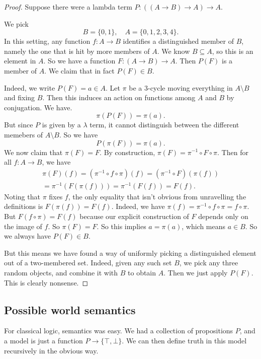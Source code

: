 \documentclass[a4paper]{article}
\begin{document}
\begin{proof}
  Suppose there were a lambda term $P: ((A \to B) \to A) \to A$.

  We pick
  \[
    B = \{0, 1\}, \quad A = \{0, 1, 2, 3, 4\}.
  \]
  In this setting, any function $f: A \to B$ identifies a distinguished member of $B$, namely the one that is hit by more members of $A$. We know $B \subseteq A$, so this is an element in $A$. So we have a function $F: (A \to B) \to A$. Then $P(F)$ is a member of $A$. We claim that in fact $P(F) \in B$.

  Indeed, we write $P(F) = a \in A$. Let $\pi$ be a $3$-cycle moving everything in $A \setminus B$ and fixing $B$. Then this induces an action on functions among $A$ and $B$ by conjugation. We have.
  \[
    \pi(P(F)) = \pi(a).
  \]
  But since $P$ is given by a $\lambda$ term, it cannot distinguish between the different memebers of $A \setminus B$. So we have
  \[
    P(\pi(F)) = \pi(a).
  \]
  We now claim that $\pi(F) = F$. By construction, $\pi (F) = \pi^{-1} \circ F \circ \pi$. Then for all $f: A \to B$, we have
  \begin{multline*}
    \pi(F)(f) = (\pi^{-1} \circ f \circ \pi)(f) = (\pi^{-1} \circ F)(\pi(f)) \\
    = \pi^{-1} (F(\pi(f))) = \pi^{-1}(F(f)) = F(f).
  \end{multline*}
  Noting that $\pi$ fixes $f$, the only equality that isn't obvious from unravelling the definitions is $F(\pi(f)) = F(f)$. Indeed, we have $\pi(f) = \pi^{-1} \circ f \circ \pi = f \circ \pi$. But $F(f\circ \pi) = F(f)$ because our explicit construction of $F$ depends only on the image of $f$. So $\pi(F) = F$. So this implies $a = \pi(a)$, which means $a \in B$. So we always have $P(F) \in B$.

  But this means we have found a way of uniformly picking a distinguished element out of a two-membered set. Indeed, given any such set $B$, we pick any three random objects, and combine it with $B$ to obtain $A$. Then we just apply $P(F)$. This is clearly nonsense.
\end{proof}

\subsection{Possible world semantics}
For classical logic, semantics was easy. We had a collection of propositions $P$, and a model is just a function $P \to \{\top, \bot\}$. We can then define truth in this model recursively in the obvious way.
\end{document}
